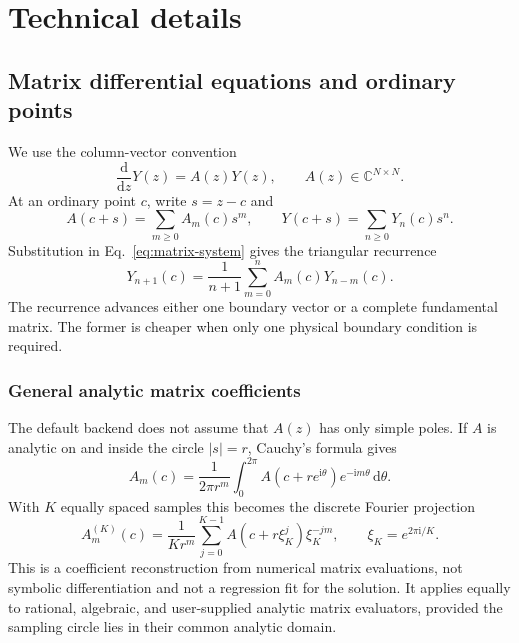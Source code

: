 \documentclass[11pt]{article}
\newcommand{\dd}{\mathrm d}
\begin{document}
\section{Technical details}
\label{sec:technical-details}

\subsection{Matrix differential equations and ordinary points}
\label{subsec:ordinary}

We use the column-vector convention
\begin{equation}
  \frac{\dd}{\dd z}Y(z)=A(z)Y(z),
  \qquad A(z)\in\mathbb C^{N\times N}.
  \label{eq:matrix-system}
\end{equation}
At an ordinary point $c$, write $s=z-c$ and
\begin{equation}
  A(c+s)=\sum_{m\geq0}A_m(c)s^m,
  \qquad
  Y(c+s)=\sum_{n\geq0}Y_n(c)s^n.
\end{equation}
Substitution in Eq.~\eqref{eq:matrix-system} gives the triangular recurrence
\begin{equation}
  Y_{n+1}(c)=\frac{1}{n+1}\sum_{m=0}^{n}A_m(c)Y_{n-m}(c).
  \label{eq:ordinary-recurrence}
\end{equation}
The recurrence advances either one boundary vector or a complete fundamental matrix.  The
former is cheaper when only one physical boundary condition is required.

\subsubsection{General analytic matrix coefficients}

The default backend does not assume that $A(z)$ has only simple poles.  If $A$ is analytic
on and inside the circle $|s|=r$, Cauchy's formula gives
\begin{equation}
  A_m(c)=\frac{1}{2\pi r^m}\int_0^{2\pi}
  A(c+r e^{\mathrm i\theta})e^{-\mathrm i m\theta}\,\dd\theta.
\end{equation}
With $K$ equally spaced samples this becomes the discrete Fourier projection
\begin{equation}
  A_m^{(K)}(c)=\frac{1}{K r^m}\sum_{j=0}^{K-1}
  A(c+r\xi_K^j)\xi_K^{-jm},
  \qquad \xi_K=e^{2\pi\mathrm i/K}.
  \label{eq:cauchy-dft}
\end{equation}
This is a coefficient reconstruction from numerical matrix evaluations, not symbolic
differentiation and not a regression fit for the solution.  It applies equally to rational,
algebraic, and user-supplied analytic
matrix evaluators, provided the sampling circle lies in their common analytic domain.
\end{document}
